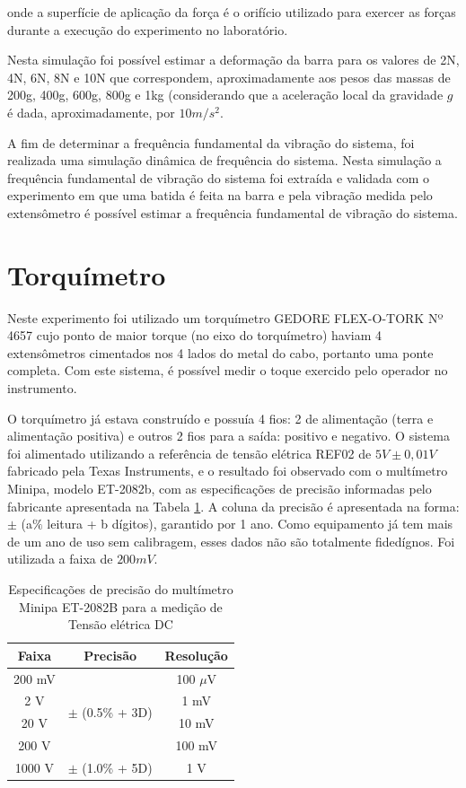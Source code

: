 \documentclass[a4paper]{instrumentacao}
\begin{document}
\noindent onde a superfície de aplicação da força é o orifício utilizado para exercer as forças durante a execução do experimento no laboratório.

Nesta simulação foi possível estimar a deformação da barra para os valores de 2N, 4N, 6N, 8N e 10N que correspondem, aproximadamente aos pesos das massas de 200g, 400g, 600g, 800g e 1kg (considerando que a aceleração local da gravidade $g$ é dada, aproximadamente, por $10 m/s^2$.

A fim de determinar a frequência fundamental da vibração do sistema, foi realizada uma simulação dinâmica de frequência do sistema. Nesta simulação a frequência fundamental de vibração do sistema foi extraída e validada com o experimento em que uma batida é feita na barra e pela vibração medida pelo extensômetro é possível estimar a frequência fundamental de vibração do sistema.


\section{Torquímetro}
Neste experimento foi utilizado um torquímetro GEDORE FLEX-O-TORK Nº 4657 cujo ponto de maior torque (no eixo do torquímetro) haviam 4 extensômetros cimentados nos 4 lados do metal do cabo, portanto uma ponte completa. Com este sistema, é possível medir o toque exercido pelo operador no instrumento.

O torquímetro já estava construído e possuía 4 fios: 2 de alimentação (terra e alimentação positiva) e outros 2 fios para a saída: positivo e negativo. O sistema foi alimentado utilizando a referência de tensão elétrica REF02 de $5V \pm 0,01V$ \cite{datasheet-ref02} fabricado pela Texas Instruments, e o resultado foi observado com o multímetro Minipa, modelo ET-2082b, com as especificações de precisão informadas pelo fabricante apresentada na Tabela \ref{tab:precisão-multimetro}. A coluna da precisão é apresentada na forma: $\pm$ (a$\%$ leitura + b dígitos), garantido por 1 ano. Como equipamento já tem mais de um ano de uso sem calibragem, esses dados não são totalmente fidedígnos. Foi utilizada a faixa de $200 mV$.

\begin{table}[H]
\centering
\caption{Especificações de precisão do multímetro Minipa ET-2082B para a medição de Tensão elétrica DC}
\label{tab:precisão-multimetro}
\begin{tabular}{|c|c|c|}
\hline
\textbf{Faixa} & \textbf{Precisão} & \textbf{Resolução} \\ \hline
200 mV         & \multirow{4}{*}{$\pm$ (0.5\% + 3D)} & 100 $\mu$V \\ \cline{1-1} \cline{3-3} 
2 V            &                              & 1 mV               \\ \cline{1-1} \cline{3-3} 
20 V           &                              & 10 mV              \\ \cline{1-1} \cline{3-3} 
200 V          &                              & 100 mV             \\ \hline
1000 V         & $\pm$ (1.0\% + 5D)           & 1 V                \\ \hline
\end{tabular}
\end{table}
\end{document}
